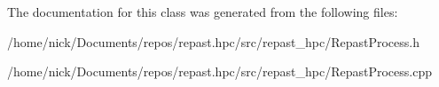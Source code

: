 The documentation for this class was generated from the following files\-:\begin{DoxyCompactItemize}
\item 
/home/nick/\-Documents/repos/repast.\-hpc/src/repast\-\_\-hpc/Repast\-Process.\-h\item 
/home/nick/\-Documents/repos/repast.\-hpc/src/repast\-\_\-hpc/Repast\-Process.\-cpp\end{DoxyCompactItemize}
